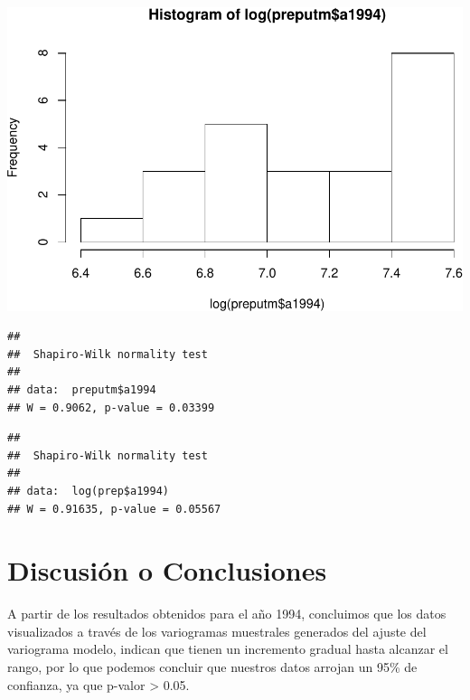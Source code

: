 \documentclass[11pt,]{article}
\newenvironment{Shaded}{\begin{snugshade}}{\end{snugshade}}
\newcommand{\KeywordTok}[1]{\textcolor[rgb]{0.13,0.29,0.53}{\textbf{#1}}}
\newcommand{\OperatorTok}[1]{\textcolor[rgb]{0.81,0.36,0.00}{\textbf{#1}}}
\newcommand{\NormalTok}[1]{#1}
\begin{document}
\includegraphics{proyecto_files/figure-latex/unnamed-chunk-3-2.pdf}

\begin{Shaded}
\end{Shaded}

\begin{verbatim}
## 
##  Shapiro-Wilk normality test
## 
## data:  preputm$a1994
## W = 0.9062, p-value = 0.03399
\end{verbatim}

\begin{Shaded}
\end{Shaded}

\begin{verbatim}
## 
##  Shapiro-Wilk normality test
## 
## data:  log(prep$a1994)
## W = 0.91635, p-value = 0.05567
\end{verbatim}

\section{Discusión o Conclusiones}\label{discusiuxf3n-o-conclusiones}

A partir de los resultados obtenidos para el año 1994, concluimos que
los datos visualizados a través de los variogramas muestrales generados
del ajuste del variograma modelo, indican que tienen un incremento
gradual hasta alcanzar el rango, por lo que podemos concluir que
nuestros datos arrojan un 95\% de confianza, ya que p-valor
\textgreater{} 0.05.
\end{document}
